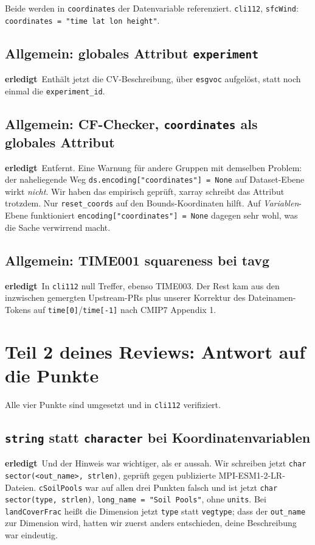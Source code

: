 \documentclass[11pt,a4paper]{article}
\newcommand{\code}[1]{\texttt{\small #1}}
\newcommand{\ok}{\textcolor{green!45!black}{\textbf{erledigt}}}
\begin{document}
Beide werden in \code{coordinates} der Datenvariable referenziert.
\code{cli112}, \code{sfcWind}: \code{coordinates = "time lat lon height"}.

\subsection*{Allgemein: globales Attribut \code{experiment}}
\ok\ Enth\"alt jetzt die CV-Beschreibung, \"uber \code{esgvoc} aufgel\"ost, statt
noch einmal die \code{experiment\_id}.

\subsection*{Allgemein: CF-Checker, \code{coordinates} als globales Attribut}
\ok\ Entfernt. Eine Warnung f\"ur andere Gruppen mit demselben Problem: der
naheliegende Weg \code{ds.encoding["coordinates"] = None} auf Dataset-Ebene wirkt
\emph{nicht}. Wir haben das empirisch gepr\"uft, xarray schreibt das Attribut
trotzdem. Nur \code{reset\_coords} auf den Bounds-Koordinaten hilft. Auf
\emph{Variablen}-Ebene funktioniert \code{encoding["coordinates"] = None} dagegen
sehr wohl, was die Sache verwirrend macht.

\subsection*{Allgemein: TIME001 squareness bei tavg}
\ok\ In \code{cli112} null Treffer, ebenso TIME003. Der Rest kam aus den
inzwischen gemergten Upstream-PRs plus unserer Korrektur des Dateinamen-Tokens auf
\code{time[0]}/\code{time[-1]} nach CMIP7 Appendix 1.

\section{Teil 2 deines Reviews: Antwort auf die Punkte}

Alle vier Punkte sind umgesetzt und in \code{cli112} verifiziert.

\subsection*{\code{string} statt \code{character} bei Koordinatenvariablen}
\ok\ Und der Hinweis war wichtiger, als er aussah. Wir schreiben jetzt
\code{char sector(<out\_name>, strlen)}, gepr\"uft gegen publizierte
MPI-ESM1-2-LR-Dateien. \code{cSoilPools} war auf allen drei Punkten falsch und ist
jetzt \code{char sector(type, strlen)}, \code{long\_name = "Soil Pools"}, ohne
\code{units}. Bei \code{landCoverFrac} hei\ss t die Dimension jetzt \code{type} statt
\code{vegtype}; dass der \code{out\_name} zur Dimension wird, hatten wir zuerst
anders entschieden, deine Beschreibung war eindeutig.
\end{document}
